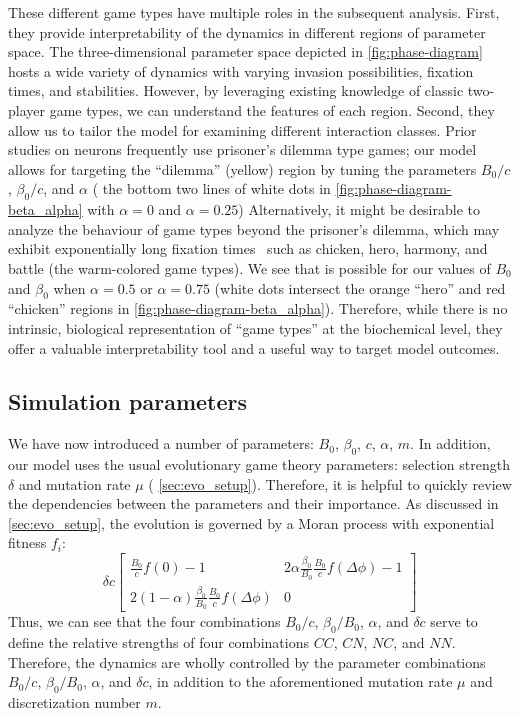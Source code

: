 \documentclass[10pt,letterpaper]{article}
\begin{document}
These different game types have multiple roles in the subsequent analysis.
First, they provide interpretability of the dynamics in
different regions of parameter space.
The three-dimensional parameter space depicted in
\cref{fig:phase-diagram} hosts a wide variety of dynamics
with varying invasion possibilities,
fixation times, and stabilities.
However, by leveraging existing knowledge of classic
two-player game types,
we can understand the features of each region.
Second, they allow us to tailor the model for examining different
interaction classes.
Prior studies on neurons frequently use prisoner's dilemma type games;
our model allows for targeting the ``dilemma'' (yellow) region
by tuning the parameters $B_0/c$, $\beta_0/c$, and $\alpha$
(\eg{} the bottom two lines of white dots in
\cref{fig:phase-diagram-beta_alpha} with $\alpha = 0$ and $\alpha=0.25$)
Alternatively, it might be desirable to analyze the behaviour
of game types
beyond the prisoner's dilemma,
which may exhibit exponentially long fixation times~\cite{antal2006fixation}
such as chicken, hero, harmony, and battle (the warm-colored game types).
We see that is possible for our values of $B_0$ and $\beta_0$
when $\alpha = 0.5$ or $\alpha = 0.75$ (white dots intersect the
orange ``hero'' and red ``chicken'' regions in
\cref{fig:phase-diagram-beta_alpha}).
Therefore, while there is no intrinsic, biological representation
of ``game types'' at the biochemical level, they offer a valuable interpretability
tool and a useful way to target model outcomes.

\subsection{Simulation parameters}
\label{sec:simulation_parameters}
We have now introduced a number of parameters:
$B_0$, $\beta_0$, $c$, $\alpha$, $m$.
In addition,
our model uses the usual evolutionary game theory parameters:
selection strength $\delta$ and mutation rate $\mu$
(\cf{} \cref{sec:evo_setup}).
Therefore, it is helpful to quickly review the dependencies between the
parameters and their importance.
As discussed in \cref{sec:evo_setup},
the evolution is governed by a Moran process with exponential fitness
$f_i$:
\begin{equation*}
	\delta c
\begin{bmatrix}
	 \frac{B_0}{c} f(0) - 1 & 2 \alpha \frac{\beta_0}{B_0}
		\frac{B_0}{c} f(\Delta \phi) - 1 \\
   2 (1 - \alpha) \frac{\beta_0}{B_0}
		\frac{B_0}{c} f(\Delta \phi) & 0
\end{bmatrix}
\end{equation*}
Thus, we can see that the four combinations
$B_0/c$, $\beta_0/B_0$, $\alpha$, and $\delta c$
serve to define the relative strengths of four combinations $CC$, $CN$,
$NC$, and $NN$.
Therefore, the dynamics are wholly controlled by the
parameter combinations $B_0/c$, $\beta_0/B_0$, $\alpha$, and $\delta
c$,
in addition to the aforementioned mutation rate $\mu$ and discretization
number $m$.
\end{document}
